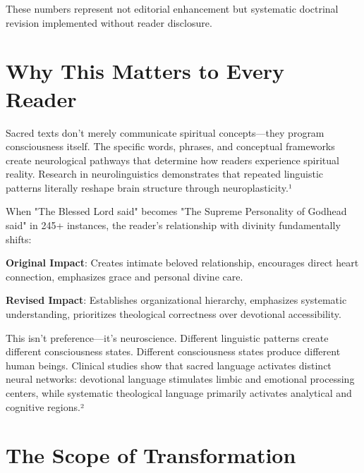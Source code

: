 \documentclass[11pt,twoside]{book}
\begin{document}
These numbers represent not editorial enhancement but systematic doctrinal revision implemented without reader disclosure.
\section*{Why This Matters to Every Reader}
\label{sec:org25b4f0e}

Sacred texts don't merely communicate spiritual concepts—they program consciousness itself. The specific words, phrases, and conceptual frameworks create neurological pathways that determine how readers experience spiritual reality. Research in neurolinguistics demonstrates that repeated linguistic patterns literally reshape brain structure through neuroplasticity.¹

When "The Blessed Lord said" becomes "The Supreme Personality of Godhead said" in 245+ instances, the reader's relationship with divinity fundamentally shifts:

\begin{pullquotebox}
\textbf{Original Impact}: Creates intimate beloved relationship, encourages direct heart connection, emphasizes grace and personal divine care.

\textbf{Revised Impact}: Establishes organizational hierarchy, emphasizes systematic understanding, prioritizes theological correctness over devotional accessibility.
\end{pullquotebox}

This isn't preference—it's neuroscience. Different linguistic patterns create different consciousness states. Different consciousness states produce different human beings. Clinical studies show that sacred language activates distinct neural networks: devotional language stimulates limbic and emotional processing centers, while systematic theological language primarily activates analytical and cognitive regions.²
\section*{The Scope of Transformation}
\label{sec:org5b3c2fa}
\end{document}

